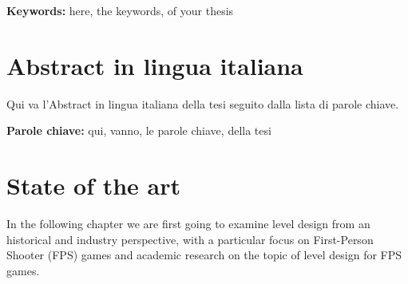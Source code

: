 \documentclass{Configuration_Files/PoliMi3i_thesis}
\begin{document}
\textbf{Keywords:} here, the keywords, of your thesis %

\chapter*{Abstract in lingua italiana}
Qui va l'Abstract in lingua italiana della tesi seguito dalla lista di parole chiave.

\textbf{Parole chiave:} qui, vanno, le parole chiave, della tesi %


\thispagestyle{empty}
\tableofcontents %
\thispagestyle{empty}
\cleardoublepage

%
%
%    
%

\mainmatter %


\chapter{State of the art}
\label{ch:state_of_the_art}
In the following chapter we are first going to examine level design from an historical and industry perspective, with a particular focus on First-Person Shooter (FPS) games and academic research on the topic of level design for FPS games.
\end{document}
